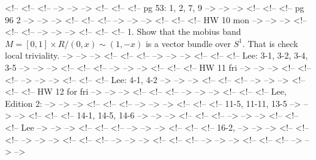 \documentclass{amsart}
\numberwithin{equation}{section}
\theoremstyle{definition}
\theoremstyle{remark}
\begin{document}
<!-- <!-- <!--  --> --> -->
<!-- <!-- <!-- pg 53: 1, 2, 7, 9   --> --> -->
<!-- <!-- <!-- pg 96 2   --> --> -->
<!-- <!-- <!--  --> --> -->
<!-- <!-- <!-- HW 10 mon --> --> -->
<!-- <!-- <!--  --> --> -->
<!-- <!-- <!-- 1. Show that the mobius band $M=[0,1] \times R /(0,x) \sim (1,-x)$ is a vector bundle over $S^1$. That is check local triviality.   --> --> -->
<!-- <!-- <!--  --> --> -->
<!-- <!-- <!-- Lee: 3-1, 3-2, 3-4, 3-5   --> --> -->
<!-- <!-- <!--  --> --> -->
<!-- <!-- <!-- HW 11 fri --> --> -->
<!-- <!-- <!--  --> --> -->
<!-- <!-- <!-- Lee: 4-1, 4-2   --> --> -->
<!-- <!-- <!--  --> --> -->
<!-- <!-- <!-- HW 12 for fri --> --> -->
<!-- <!-- <!--  --> --> -->
<!-- <!-- <!-- Lee, Edition 2: --> --> -->
<!-- <!-- <!--  --> --> -->
<!-- <!-- <!-- 11-5,  11-11, 13-5   --> --> -->
<!-- <!-- <!-- 14-1, 14-5, 14-6   --> --> -->
<!-- <!-- <!--  --> --> -->
<!-- <!-- <!-- Lee --> --> -->
<!-- <!-- <!--  --> --> -->
<!-- <!-- <!-- 16-2,  --> --> -->
<!-- <!-- <!--  --> --> -->
<!-- <!-- <!--  --> --> -->
<!-- <!-- <!--  --> --> -->
<!-- <!-- <!--  --> --> -->


\end{document}
